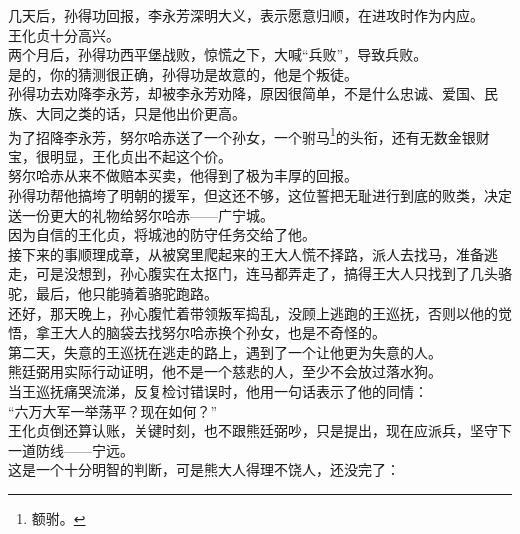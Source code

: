 \begin{multicols}{\theparacolNo}
几天后，孙得功回报，李永芳深明大义，表示愿意归顺，在进攻时作为内应。\\

王化贞十分高兴。\\

两个月后，孙得功西平堡战败，惊慌之下，大喊“兵败”，导致兵败。\\

是的，你的猜测很正确，孙得功是故意的，他是个叛徒。\\

孙得功去劝降李永芳，却被李永芳劝降，原因很简单，不是什么忠诚、爱国、民族、大同之类的话，只是他出价更高。\\

为了招降李永芳，努尔哈赤送了一个孙女，一个驸马\footnote{额驸。}的头衔，还有无数金银财宝，很明显，王化贞出不起这个价。\\

努尔哈赤从来不做赔本买卖，他得到了极为丰厚的回报。\\

孙得功帮他搞垮了明朝的援军，但这还不够，这位誓把无耻进行到底的败类，决定送一份更大的礼物给努尔哈赤——广宁城。\\

因为自信的王化贞，将城池的防守任务交给了他。\\

接下来的事顺理成章，从被窝里爬起来的王大人慌不择路，派人去找马，准备逃走，可是没想到，孙心腹实在太抠门，连马都弄走了，搞得王大人只找到了几头骆驼，最后，他只能骑着骆驼跑路。\\

还好，那天晚上，孙心腹忙着带领叛军捣乱，没顾上逃跑的王巡抚，否则以他的觉悟，拿王大人的脑袋去找努尔哈赤换个孙女，也是不奇怪的。\\

第二天，失意的王巡抚在逃走的路上，遇到了一个让他更为失意的人。\\

熊廷弼用实际行动证明，他不是一个慈悲的人，至少不会放过落水狗。\\

当王巡抚痛哭流涕，反复检讨错误时，他用一句话表示了他的同情：\\

“六万大军一举荡平？现在如何？”\\

王化贞倒还算认账，关键时刻，也不跟熊廷弼吵，只是提出，现在应派兵，坚守下一道防线——宁远。\\

这是一个十分明智的判断，可是熊大人得理不饶人，还没完了：\\


\end{multicols}
